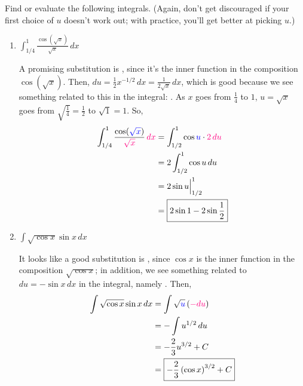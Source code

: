 \documentclass{article}
\begin{document}
\begin{enumerate}
 Find or evaluate the following
  integrals.  (Again, don't get discouraged if your first choice of $u$
  doesn't work out; with practice, you'll get better at picking $u$.)

  \probonly{}
    \begin{enumerate}
    \item
      \begin{problem}[\vfill]
        $\displaystyle \int_{1/4}^1 \frac{\cos \left( \sqrt{x}
          \right)}{\sqrt{x}}\,dx$
      \end{problem}

      \begin{solution} %
        A promising substitution is , since it's the
        inner function in the composition $\cos \left( \sqrt{x} \right)$.
        Then, $du = \frac{1}{2} x^{-1/2}\,dx = \frac{1}{2\sqrt{x}}\,dx$,
        which is good because we see something related to this in the
        integral: .  As $x$
        goes from $\frac{1}{4}$ to $1$, $u = \sqrt{x}$ goes from
        $\sqrt{\frac{1}{4}} = \frac{1}{2}$ to $\sqrt{1} = 1$.  So,
        \begin{align*}
          \int_{1/4}^1 \frac{\cos (\sub{\sqrt{x}})}{\subd{\sqrt{x}}} \,
          \subd{dx}
          &= \int_{1/2}^1 \cos \sub{u} \cdot \subd{2\,du} \\
          &= 2 \int_{1/2}^1 \cos u \, du \\ 
          &= 2 \sin u \Big|_{1/2}^1 \\
          &= \boxed{2 \sin 1 - 2 \sin \frac{1}{2}}
        \end{align*}
      \end{solution}

    \item
      \begin{problem}[\vfill]
        $\displaystyle \int \sqrt{\cos x}\sin x \,dx$
      \end{problem}

      \begin{solution}
        It looks like a good substitution is , since
        $\cos x$ is the inner function in the composition $\sqrt{\cos x}$;
        in addition, we see something related to $du = - \sin x\,dx$ in
        the integral, namely .  Then,
        \begin{align*}
          \int \sqrt{\cos x}\sin x \,dx &= \int \sqrt{\sub{u}}
          \left(\subd{-du} \right) \\
          &= - \int u^{1/2}\,du \\
          &= - \frac{2}{3} u^{3/2} + C \\
          &= \boxed{- \frac{2}{3} \left( \cos x \right)^{3/2} + C}
        \end{align*}
      \end{solution}


\end{enumerate}
\end{enumerate}
\end{document}
